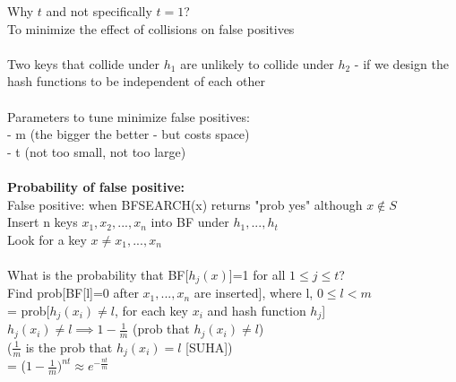 \documentclass{article}
\begin{document}
	Why $t$ and not specifically $t=1$?\\
	To minimize the effect of collisions on false positives\\\\
	Two keys that collide under $h_1$ are unlikely to collide under $h_2$ - if we design the hash functions to be independent of each other\\\\
	Parameters to tune minimize false positives:\\
	- m (the bigger the better - but costs space)\\
	- t (not too small, not too large)\\\\
	\textbf{Probability of false positive:}\\
	False positive: when BFSEARCH(x) returns "prob yes" although $x\notin S$\\
	Insert n keys $x_1,x_2,...,x_n$ into BF under $h_1,...,h_t$\\
	Look for a key $x\not= x_1,...,x_n$\\\\
	What is the probability that BF[$h_j(x)$]=1 for all $1\le j\le t$?\\
	Find prob[BF[l]=0 after $x_1,...,x_n$ are inserted], where l, $ 0\le l<m$\\
	= prob[$h_j(x_i)\not= l$, for each key $x_i$ and hash function $h_j$]\\
	$h_j(x_i)\not= l \implies 1 - \frac{1}{m}$ (prob that $h_j(x_i)\not= l$)\\($\frac{1}{m}$ is the prob that $h_j(x_i) = l$ [SUHA])\\
	= ($1-\frac{1}{m})^{nt} \approx e^{-\frac{nt}{m}}$
	
\end{document}
